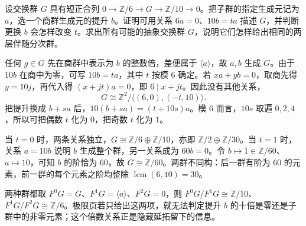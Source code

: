\begin{exercise}\label{g2:ex:abelian-six-ten-extensions}
	设交换群 \(G\) 具有短正合列 \(0\to\mathbb Z/6\to G\to\mathbb Z/10\to0\)。把子群的指定生成元记为 \(a\)，选一个商群生成元的提升 \(b\)。证明可用关系 \(6a=0\)、\(10b=ta\) 描述 \(G\)，并判断更换 \(b\) 会怎样改变 \(t\)。求出所有可能的抽象交换群 \(G\)，说明它们怎样给出相同的两层伴随分次群。
\end{exercise}
\begin{solution}
	任何 \(g\in G\) 先在商群中表示为 \(b\) 的整数倍，差便属于 \(\langle a\rangle\)，故 \(a,b\) 生成 \(G\)。由于 \(10b\) 在商中为零，可写 \(10b=ta\)，其中 \(t\) 按模 \(6\) 确定。若 \(xa+yb=0\)，取商先得 \(y=10j\)，再代入得 \((x+jt)a=0\)，即 \(6\mid x+jt\)。因此没有其他关系，
	\[
		G\cong\mathbb Z^2/\langle(6,0),(-t,10)\rangle.
	\]
	把提升换成 \(b+sa\) 后，\(10(b+sa)=(t+10s)a\)。模 \(6\) 而言，\(10s\) 取遍 \(0,2,4\)，所以可把偶数 \(t\) 化为 \(0\)，把奇数 \(t\) 化为 \(1\)。

	当 \(t=0\) 时，两条关系独立，\(G\cong\mathbb Z/6\oplus\mathbb Z/10\)，亦即 \(\mathbb Z/2\oplus\mathbb Z/30\)。当 \(t=1\) 时，关系 \(a=10b\) 说明 \(b\) 生成整个群，另一关系成为 \(60b=0\)。令 \(b\mapsto\overline1\in\mathbb Z/60\)、\(a\mapsto\overline{10}\)，可知 \(b\) 的阶恰为 \(60\)，故 \(G\cong\mathbb Z/60\)。两群不同构：后一群有阶为 \(60\) 的元素，前一群的每个元素之阶均整除 \(\operatorname{lcm}(6,10)=30\)。

	两种群都取 \(F^0G=G\)、\(F^1G=\langle a\rangle\)、\(F^2G=0\)，则 \(F^0G/F^1G\cong\mathbb Z/10\)、\(F^1G/F^2G\cong\mathbb Z/6\)。极限页若只给出这两项，就无法判定提升 \(b\) 的十倍是零还是子群中的非零元素；这个倍数关系正是隐藏延拓留下的信息。
\end{solution}

